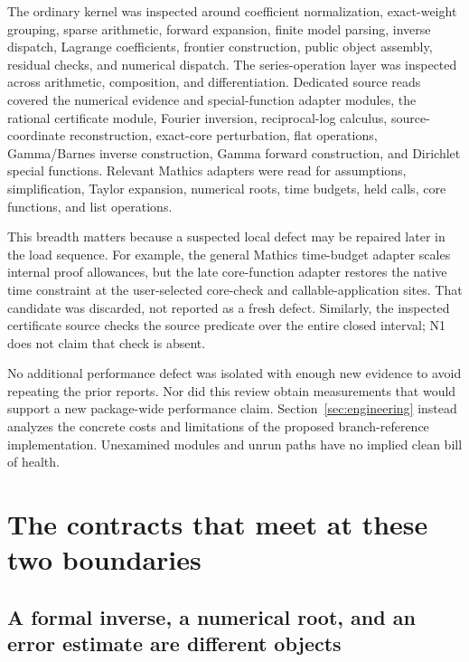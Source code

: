 \documentclass[11pt,letterpaper]{article}
\begin{document}
The ordinary kernel was inspected around coefficient normalization, exact-weight grouping, sparse arithmetic, forward expansion, finite model parsing, inverse dispatch, Lagrange coefficients, frontier construction, public object assembly, residual checks, and numerical dispatch. The series-operation layer was inspected across arithmetic, composition, and differentiation. Dedicated source reads covered the numerical evidence and special-function adapter modules, the rational certificate module, Fourier inversion, reciprocal-log calculus, source-coordinate reconstruction, exact-core perturbation, flat operations, Gamma/Barnes inverse construction, Gamma forward construction, and Dirichlet special functions. Relevant Mathics adapters were read for assumptions, simplification, Taylor expansion, numerical roots, time budgets, held calls, core functions, and list operations.\cite{core,series,cert,numerical,special,fourier,reciprocal,sourcecoord,corepert,flat,gamma,barnes,dirichlet,mathics}

This breadth matters because a suspected local defect may be repaired later in the load sequence. For example, the general Mathics time-budget adapter scales internal proof allowances, but the late core-function adapter restores the native time constraint at the user-selected core-check and callable-application sites. That candidate was discarded, not reported as a fresh defect. Similarly, the inspected certificate source checks the source predicate over the entire closed interval; N1 does not claim that check is absent.\cite{timebudget,corefunctions,cert}

No additional performance defect was isolated with enough new evidence to avoid repeating the prior reports. Nor did this review obtain measurements that would support a new package-wide performance claim. Section~\ref{sec:engineering} instead analyzes the concrete costs and limitations of the proposed branch-reference implementation. Unexamined modules and unrun paths have no implied clean bill of health.

\section{The contracts that meet at these two boundaries}
\label{sec:architecture}

\subsection{A formal inverse, a numerical root, and an error estimate are different objects}
\end{document}
